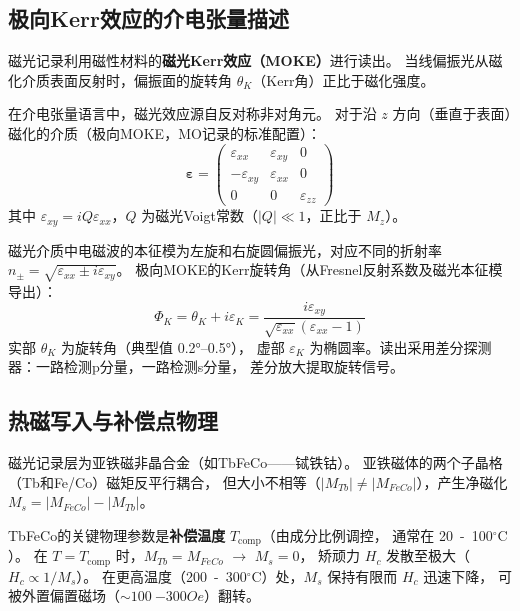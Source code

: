 \documentclass[11pt,a4paper,twoside]{article}
\newcommand{\degC}{\ensuremath{{}^{\circ}\mathrm{C}}}
\theoremstyle{definition}\newtheorem{definition}{定义}[section]
\theoremstyle{plain}\newtheorem{theorem}{定理}[section]
\theoremstyle{remark}\newtheorem{remark}{注解}[section]
\begin{document}
\subsection{极向Kerr效应的介电张量描述}

磁光记录利用磁性材料的\textbf{磁光Kerr效应（MOKE）}进行读出。
当线偏振光从磁化介质表面反射时，偏振面的旋转角 $\theta_K$（Kerr角）正比于磁化强度。

在介电张量语言中，磁光效应源自反对称非对角元。
对于沿 $z$ 方向（垂直于表面）磁化的介质（极向MOKE，MO记录的标准配置）：
\begin{equation}\label{eq:dielectric-mo}
  \boldsymbol{\varepsilon} =
  \begin{pmatrix}
    \varepsilon_{xx} & \varepsilon_{xy} & 0 \\
    -\varepsilon_{xy} & \varepsilon_{xx} & 0 \\
    0 & 0 & \varepsilon_{zz}
  \end{pmatrix}
\end{equation}
其中 $\varepsilon_{xy} = i Q \varepsilon_{xx}$，$Q$ 为磁光Voigt常数（$|Q| \ll 1$，正比于 $M_z$）。

磁光介质中电磁波的本征模为左旋和右旋圆偏振光，对应不同的折射率
$n_\pm = \sqrt{\varepsilon_{xx} \pm i\varepsilon_{xy}}$。
极向MOKE的Kerr旋转角（从Fresnel反射系数及磁光本征模导出）：
\begin{equation}
  \Phi_K = \theta_K + i \varepsilon_K
         = \frac{i\varepsilon_{xy}}{\sqrt{\varepsilon_{xx}}(\varepsilon_{xx} - 1)}
\end{equation}
实部 $\theta_K$ 为旋转角（典型值 \ang{0.2}--\ang{0.5}），
虚部 $\varepsilon_K$ 为椭圆率。读出采用差分探测器：一路检测p分量，一路检测s分量，
差分放大提取旋转信号。

\subsection{热磁写入与补偿点物理}

磁光记录层为亚铁磁非晶合金（如TbFeCo——铽铁钴）。
亚铁磁体的两个子晶格（Tb和Fe/Co）磁矩反平行耦合，
但大小不相等（$|M_{Tb}| \neq |M_{FeCo}|$），产生净磁化 $M_s = |M_{FeCo}| - |M_{Tb}|$。

TbFeCo的关键物理参数是\textbf{补偿温度} $T_{\text{comp}}$（由成分比例调控，
通常在 \SI{20}{-100}{\degC{}}）。
在 $T = T_{\text{comp}}$ 时，$M_{Tb} = M_{FeCo}$ $\to$ $M_s = 0$，
矫顽力 $H_c$ 发散至极大（$H_c \propto 1/M_s$）。
在更高温度（\SI{200}{-300}{\degC{}}）处，$M_s$ 保持有限而 $H_c$ 迅速下降，
可被外置偏置磁场（$\sim \SI{100}{-300}{Oe}$）翻转。
\end{document}
